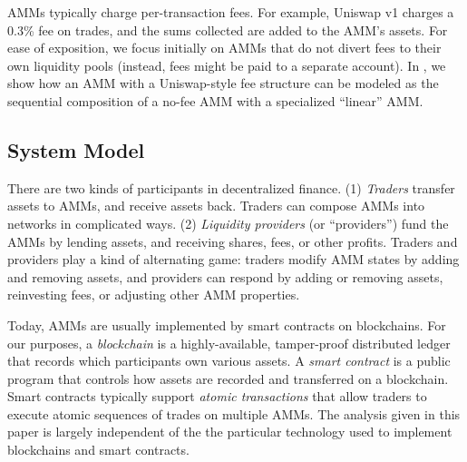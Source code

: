 AMMs typically charge per-transaction fees.
For example, Uniswap v1 charges a 0.3\% fee on trades,
and the sums collected are added to the AMM's assets.
For ease of exposition, we focus initially on AMMs that do not divert
fees to their own liquidity pools
(instead, fees might be paid to a separate account).
In ,
we show how an AMM with a Uniswap-style fee structure can be modeled as
the sequential composition of a no-fee AMM with a specialized ``linear'' AMM.

\subsection{System Model}
There are two kinds of participants in decentralized finance.
(1) \emph{Traders} transfer assets to AMMs, and receive assets back.
Traders can compose AMMs into networks in complicated ways.
(2) \emph{Liquidity providers} (or ``providers'') fund the AMMs by
lending assets, and receiving shares, fees, or other profits.
Traders and providers play a kind of alternating game:
traders modify AMM states by adding and removing assets,
and providers can respond by adding or removing assets,
reinvesting fees, or adjusting other AMM properties.

Today, AMMs are usually implemented by smart contracts on blockchains.
For our purposes,
a \emph{blockchain} is a highly-available, tamper-proof distributed ledger
that records which participants own various assets.
A \emph{smart contract} is a public program that controls how assets are
recorded and transferred on a blockchain.
Smart contracts typically support \emph{atomic transactions} that
allow traders to execute atomic sequences of trades on multiple AMMs.
The analysis given in this paper is largely independent of the
the particular technology used to implement blockchains and smart contracts.
